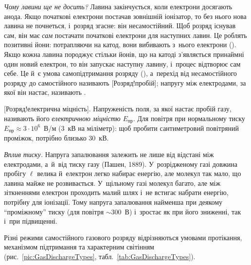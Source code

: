 \emph{Чому лавини ще не досить?} Лавина закінчується, коли електрони досягають анода.
Якщо початкові електрони постачав зовнішній іонізатор, то без нього нова лавина не
почнеться, і~розряд згасне: він несамостійний. Щоб розряд існував сам, він має \emph{сам}
постачати початкові електрони для наступних лавин. Це роблять позитивні йони: потрапляючи
на катод, вони вибивають з~нього електрони (). Якщо кожна лавина
породжує стільки йонів, що на катоді з'являється принаймні один новий електрон, то він
запускає наступну лавину, і~процес відтворює сам себе. Це й~є умова самопідтримання
розряду (), а~перехід від несамостійного розряду до самостійного
називають [Розряд!пробій]; напругу між електродами, за якої він настає, називають
.

[Розряд!електрична міцність]. Напруженість поля, за якої настає пробій газу, називають його
\emph{електричною міцністю} $E_{\text{пр}}$. Для повітря при нормальному тиску
$E_{\text{пр}}\approx3\cdot10^{6}$~В/м (3~кВ на міліметр): щоб пробити сантиметровий
повітряний проміжок, потрібно близько $30$~кВ.

\emph{Вплив тиску.} Напруга запалювання залежить не лише від відстані між електродами,
а~й~від тиску газу (Пашен, 1889). У~розрідженому газі довжина пробігу $\ell$ велика
й~електрон легко набирає енергію, але молекул так мало, що лавина майже не розвивається.
У~щільному газі молекул багато, але між зіткненнями електрон проходить малий шлях і~не
встигає набрати енергію, потрібну для іонізації. Тому напруга запалювання найменша при
деякому \enquote{проміжному} тиску (для повітря $\sim300$~В) і~зростає як при його
зниженні, так і~при підвищенні.

Різні режими самостійного газового розряду відрізняються умовами протікання, механізмом
підтримання та характерним світінням (рис.~\ref{pic:GasDischargeTypes},
табл.~\ref{tab:GasDischargeTypes}).


